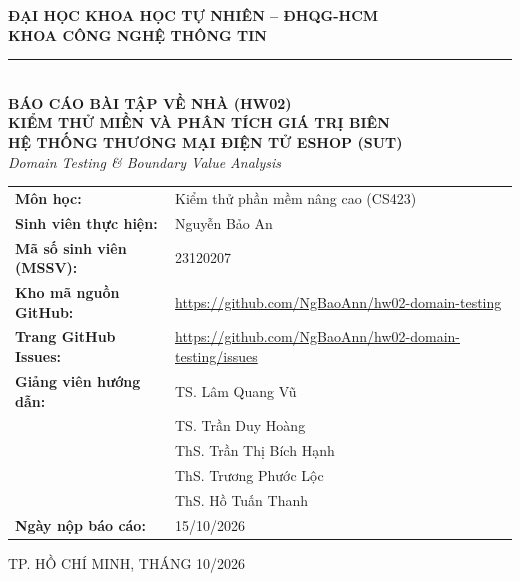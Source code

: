 \documentclass[11pt,a4paper]{article}
\begin{document}
\begin{titlepage}
    \centering
    \vspace*{1.5cm}
    {\large \textbf{ĐẠI HỌC KHOA HỌC TỰ NHIÊN -- ĐHQG-HCM}}\\[0.2cm]
    {\large \textbf{KHOA CÔNG NGHỆ THÔNG TIN}}\\[0.4cm]
    \rule{0.6\textwidth}{0.8pt}\\[2.5cm]

    {\Large \textbf{BÁO CÁO BÀI TẬP VỀ NHÀ (HW02)}}\\[0.5cm]
    {\LARGE \textbf{KIỂM THỬ MIỀN VÀ PHÂN TÍCH GIÁ TRỊ BIÊN}}\\[0.3cm]
    {\Large \textbf{HỆ THỐNG THƯƠNG MẠI ĐIỆN TỬ ESHOP (SUT)}}\\[0.3cm]
    {\normalsize \textsl{Domain Testing \& Boundary Value Analysis}}\\[2.5cm]

    \begin{minipage}{0.75\textwidth}
        \normalsize
        \renewcommand{\arraystretch}{1.3}
        \begin{tabular}{ll}
            \textbf{Môn học:} & Kiểm thử phần mềm nâng cao (CS423) \\
            \textbf{Sinh viên thực hiện:} & Nguyễn Bảo An \\
            \textbf{Mã số sinh viên (MSSV):} & 23120207 \\
            \textbf{Kho mã nguồn GitHub:} & \url{https://github.com/NgBaoAnn/hw02-domain-testing} \\
            \textbf{Trang GitHub Issues:} & \url{https://github.com/NgBaoAnn/hw02-domain-testing/issues} \\
            \textbf{Giảng viên hướng dẫn:} & TS. Lâm Quang Vũ \\
            & TS. Trần Duy Hoàng \\
            & ThS. Trần Thị Bích Hạnh \\
            & ThS. Trương Phước Lộc \\
            & ThS. Hồ Tuấn Thanh \\
            \textbf{Ngày nộp báo cáo:} & 15/10/2026 \\
        \end{tabular}
    \end{minipage}

    \vfill
    {\normalsize TP. HỒ CHÍ MINH, THÁNG 10/2026}
    \vspace*{1cm}
\end{titlepage}
\end{document}

